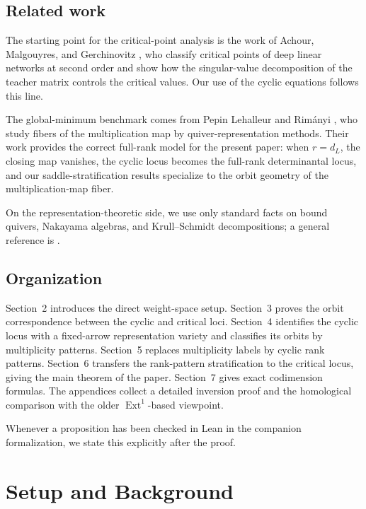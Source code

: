 \documentclass[11pt]{article}
\newcommand{\Ext}{\operatorname{Ext}}
\theoremstyle{definition}
\begin{document}
\subsection*{Related work}

The starting point for the critical-point analysis is the work of Achour,
Malgouyres, and Gerchinovitz \cite{achour2024loss}, who classify critical
points of deep linear networks at second order and show how the singular-value
decomposition of the teacher matrix controls the critical values. Our use of the
cyclic equations follows this line.

The global-minimum benchmark comes from Pepin Lehalleur and Rim\'anyi
\cite{lehalleur2024geometry}, who study fibers of the multiplication map by
quiver-representation methods. Their work provides the correct full-rank model
for the present paper: when \(r=d_L\), the closing map vanishes, the cyclic
locus becomes the full-rank determinantal locus, and our saddle-stratification
results specialize to the orbit geometry of the multiplication-map fiber.

On the representation-theoretic side, we use only standard facts on bound
quivers, Nakayama algebras, and Krull--Schmidt decompositions; a general
reference is \cite{assem2006}.

\subsection*{Organization}

Section~2 introduces the direct weight-space setup. Section~3 proves the orbit
correspondence between the cyclic and critical loci. Section~4 identifies the
cyclic locus with a fixed-arrow representation variety and classifies its orbits
by multiplicity patterns. Section~5 replaces multiplicity labels by cyclic rank
patterns. Section~6 transfers the rank-pattern stratification to the critical
locus, giving the main theorem of the paper. Section~7 gives exact codimension
formulas. The appendices collect a detailed inversion proof and the homological
comparison with the older \(\Ext^1\)-based viewpoint.

Whenever a proposition has been checked in Lean in the companion formalization,
we state this explicitly after the proof.

\section{Setup and Background}
\end{document}
